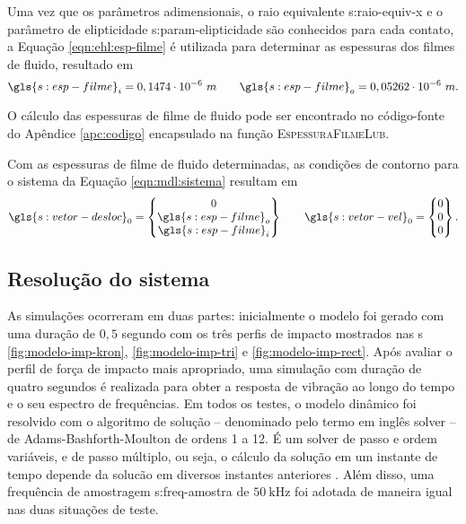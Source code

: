\documentclass[12pt,oneside,english,brazil,lmodern,siglas,simbolos,cite=num]{ucsmonograph}
\begin{document}
	Uma vez que os parâmetros adimensionais, o raio equivalente \gls{s:raio-equiv-x} e o parâmetro de elipticidade \gls{s:param-elipticidade} são conhecidos para cada contato, a Equação \ref{eqn:ehl:esp-filme} é utilizada para determinar as espessuras dos filmes de fluido, resultado em
	\begin{equation*}
		\gls{s:esp-filme}_i = 0,1474\cdot 10^{-6}\ m \qquad
		\gls{s:esp-filme}_o = 0,05262\cdot 10^{-6}\ m.
	\end{equation*}
	
	O cálculo das espessuras de filme de fluido pode ser encontrado no código-fonte do Apêndice \ref{apc:codigo} encapsulado na função \textsc{EspessuraFilmeLub}.
	
	Com as espessuras de filme de fluido determinadas, as condições de contorno para o sistema da Equação \ref{eqn:mdl:sistema} resultam em
	\begin{equation*}
		\gls{s:vetor-desloc}_0 =
		\begin{Bmatrix}
		0 \\ \gls{s:esp-filme}_o \\ \gls{s:esp-filme}_i
		\end{Bmatrix} \qquad
		\gls{s:vetor-vel}_0 = 
		\begin{Bmatrix}
		0 \\ 0 \\ 0
		\end{Bmatrix}.
	\end{equation*}
	
	\subsection{Resolução do sistema} \label{sec:mdl:sol-sistema}
	As simulações ocorreram em duas partes: inicialmente o modelo foi gerado com uma duração de $0,5$ segundo com os três perfis de impacto mostrados nas {\figurename s} \ref{fig:modelo-imp-kron}, \ref{fig:modelo-imp-tri} e \ref{fig:modelo-imp-rect}.	
	Após avaliar o perfil de força de impacto mais apropriado, uma simulação com duração de quatro segundos é realizada para obter a resposta de vibração ao longo do tempo e o seu espectro de frequências.
	Em todos os testes, o modelo dinâmico foi resolvido com o algoritmo de solução -- denominado pelo termo em inglês \foreignlanguage{english}{solver} -- de Adams-Bashforth-Moulton de ordens 1 a 12.
	É um \foreignlanguage{english}{solver} de passo e ordem variáveis, e de passo múltiplo, ou seja, o cálculo da solução em um instante de tempo depende da solucão em diversos instantes anteriores \cite{ode113}.
	Além disso, uma frequência de amostragem \gls{s:freq-amostra} de $50\ \text{kHz}$ foi adotada de maneira igual nas duas situações de teste.
	
\end{document}
